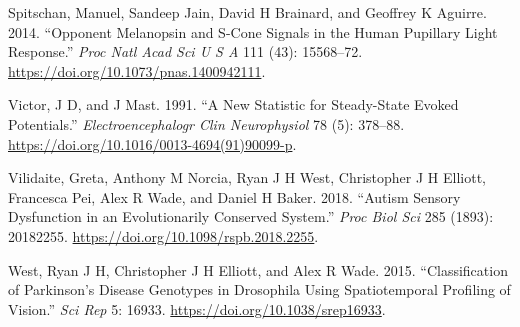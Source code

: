 \documentclass[]{article}
\begin{document}
\leavevmode\hypertarget{ref-Spitschan2014}{}%
Spitschan, Manuel, Sandeep Jain, David H Brainard, and Geoffrey K Aguirre. 2014. ``Opponent Melanopsin and S-Cone Signals in the Human Pupillary Light Response.'' \emph{Proc Natl Acad Sci U S A} 111 (43): 15568--72. \url{https://doi.org/10.1073/pnas.1400942111}.

\leavevmode\hypertarget{ref-Victor1991}{}%
Victor, J D, and J Mast. 1991. ``A New Statistic for Steady-State Evoked Potentials.'' \emph{Electroencephalogr Clin Neurophysiol} 78 (5): 378--88. \url{https://doi.org/10.1016/0013-4694(91)90099-p}.

\leavevmode\hypertarget{ref-Vilidaite2018}{}%
Vilidaite, Greta, Anthony M Norcia, Ryan J H West, Christopher J H Elliott, Francesca Pei, Alex R Wade, and Daniel H Baker. 2018. ``Autism Sensory Dysfunction in an Evolutionarily Conserved System.'' \emph{Proc Biol Sci} 285 (1893): 20182255. \url{https://doi.org/10.1098/rspb.2018.2255}.

\leavevmode\hypertarget{ref-West2015}{}%
West, Ryan J H, Christopher J H Elliott, and Alex R Wade. 2015. ``Classification of Parkinson's Disease Genotypes in Drosophila Using Spatiotemporal Profiling of Vision.'' \emph{Sci Rep} 5: 16933. \url{https://doi.org/10.1038/srep16933}.
\end{document}
